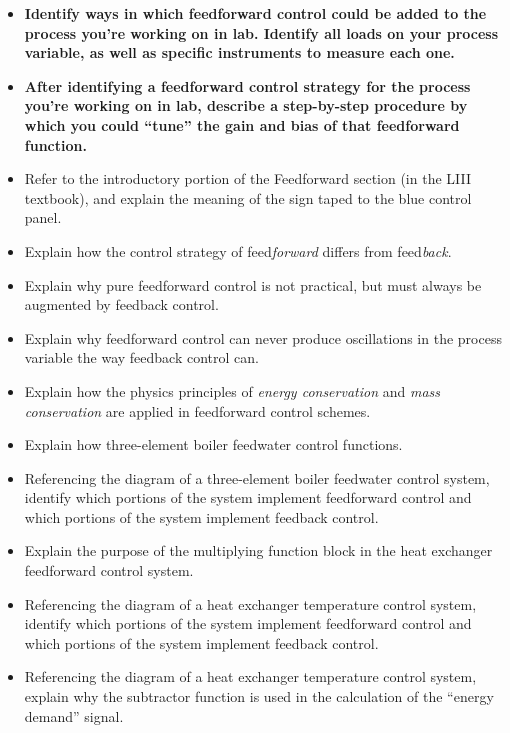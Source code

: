 \begin{itemize}
\item{} {\bf Identify ways in which feedforward control could be added to the process you're working on in lab.  Identify all loads on your process variable, as well as specific instruments to measure each one.}
\item{} {\bf After identifying a feedforward control strategy for the process you're working on in lab, describe a step-by-step procedure by which you could ``tune'' the gain and bias of that feedforward function.}
\item{} Refer to the introductory portion of the Feedforward section (in the LIII textbook), and explain the meaning of the sign taped to the blue control panel.
\item{} Explain how the control strategy of feed{\it forward} differs from feed{\it back}.
\item{} Explain why pure feedforward control is not practical, but must always be augmented by feedback control.
\item{} Explain why feedforward control can never produce oscillations in the process variable the way feedback control can.
\item{} Explain how the physics principles of {\it energy conservation} and {\it mass conservation} are applied in feedforward control schemes.
\item{} Explain how three-element boiler feedwater control functions.
\item{} Referencing the diagram of a three-element boiler feedwater control system, identify which portions of the system implement feedforward control and which portions of the system implement feedback control.
\item{} Explain the purpose of the multiplying function block in the heat exchanger feedforward control system.
\item{} Referencing the diagram of a heat exchanger temperature control system, identify which portions of the system implement feedforward control and which portions of the system implement feedback control.
\item{} Referencing the diagram of a heat exchanger temperature control system, explain why the subtractor function is used in the calculation of the ``energy demand'' signal.
\end{itemize}












